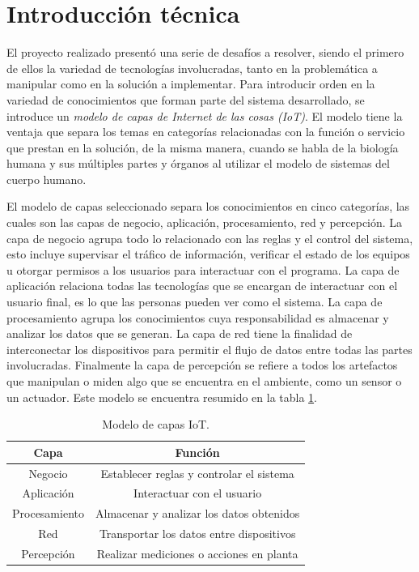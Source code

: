 \section{Introducción técnica}
\label{ch1IntroduccionTecnica}

El proyecto realizado presentó una serie de desafíos a resolver, siendo el primero de ellos la variedad de tecnologías involucradas, tanto en la problemática a manipular como en la solución a implementar. Para introducir orden en la variedad de conocimientos que forman parte del sistema desarrollado, se introduce un \emph{modelo de capas de Internet de las cosas (IoT)}. El modelo tiene la ventaja que separa los temas en categorías relacionadas con la función o servicio que prestan en la solución, de la misma manera, cuando se habla de la biología humana y sus múltiples partes y órganos al utilizar el modelo de sistemas del cuerpo humano. 

El modelo de capas seleccionado separa los conocimientos en cinco categorías, las cuales son las capas de negocio, aplicación, procesamiento, red y percepción.
La capa de negocio agrupa todo lo relacionado con las reglas y el control del sistema, esto incluye supervisar el tráfico de información, verificar el estado de los equipos u otorgar permisos a los usuarios para interactuar con el programa.
La capa de aplicación relaciona todas las tecnologías que se encargan de interactuar con el usuario final, es lo que las personas pueden ver como el sistema.
La capa de procesamiento agrupa los conocimientos cuya responsabilidad es almacenar y analizar los datos que se generan.
La capa de red tiene la finalidad de interconectar los dispositivos para permitir el flujo de datos entre todas las partes involucradas.
Finalmente la capa de percepción se refiere a todos los artefactos que manipulan o miden algo que se encuentra en el ambiente, como un sensor o un actuador. Este modelo se encuentra resumido en la tabla \ref{tab:modeloCapas}.

\begin{table}[h]
	\centering
	\caption{\label{tab:modeloCapas}Modelo de capas IoT.}
	\begin{tabular}{c c}
		\toprule
		\textbf{Capa} & \textbf{Función}                         \\
		\midrule
		Negocio       & Establecer reglas y controlar el sistema \\
		Aplicación    & Interactuar con el usuario               \\
		Procesamiento & Almacenar y analizar los datos obtenidos \\
		Red           & Transportar los datos entre dispositivos \\
		Percepción    & Realizar mediciones o acciones en planta \\
		\bottomrule
		\hline
	\end{tabular}
\end{table}

